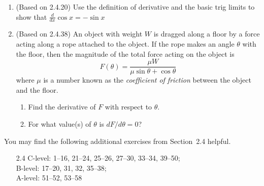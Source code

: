 \documentclass{article}
\newcommand{\ds}{\displaystyle}
\begin{document}
\begin{enumerate}
\item (Based on 2.4.20) %
  Use the definition of derivative and the basic trig limits to
  show that $\ds \frac{d}{dx} \cos x = -\sin x$
\item (Based on 2.4.38) %
  An object with weight $W$ is dragged along a floor by a force
  acting along a rope attached to the object.  If the rope makes an
  angle $\theta$ with the floor, then the magnitude of the total force
  acting on the object is
  \begin{equation*}
    F(\theta) = \frac{\mu W}{\mu\sin\theta + \cos\theta}
  \end{equation*}
  where $\mu$ is a number known as the \textit{coefficient of
    friction} between the object and the floor.
  \begin{enumerate}
  \item %
    Find the derivative of $F$ with respect to $\theta$.
  \item %
    For what value(s) of $\theta$ is $dF/d\theta = 0$?
  \end{enumerate}
\end{enumerate}

\noindent
You may find the following additional exercises from Section~2.4 helpful.
\begin{itemize}
\item[2.4] 
  C-level: 1--16, 21--24, 25--26, 27--30, 33--34, 39--50; \\
  B-level: 17--20, 31, 32, 35--38; \\
  A-level: 51--52, 53--58
\end{itemize}
\end{document}

